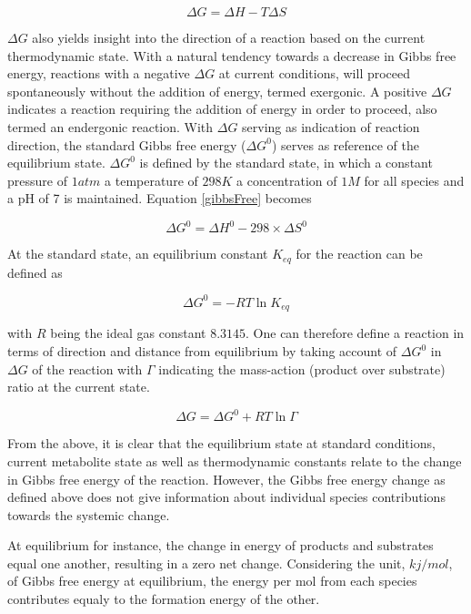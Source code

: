 \begin{equation}\label{gibbsFree}
\Delta G = \Delta H - T \Delta S
\end{equation}

$\Delta G$ also yields insight into the direction of a reaction based on the current thermodynamic state. With a natural tendency towards a decrease in Gibbs free energy, reactions with a negative $\Delta G$ at current conditions, will proceed spontaneously without the addition of energy, termed exergonic. A positive $\Delta G$ indicates a reaction requiring the addition of energy in order to proceed, also termed an endergonic reaction.  With $\Delta G$  serving as indication of reaction direction, the standard Gibbs free energy ($\Delta G^0$) serves as reference of the equilibrium state. $\Delta G^0$ is defined by the standard state, in which a constant pressure of $1 atm$ a temperature of $298K$ a concentration of $1M$ for all species and a pH of 7 is maintained. Equation \ref{gibbsFree} becomes

\begin{equation}
\Delta G^0 = \Delta H^0 - 298 \times \Delta S^0  
\end{equation}

At the standard state, an equilibrium constant $K_{eq}$ for the reaction can be defined as

\begin{equation}
\Delta G^0 = -RT \ln K_{eq}  
\end{equation}

with $R$ being the ideal gas constant $8.3145$. One can therefore define a reaction in terms of direction and distance from equilibrium by taking account of $\Delta G^0$ in $\Delta G$ of the reaction with $\Gamma$ indicating the mass-action (product over substrate) ratio at the current state.

\begin{equation}\label{mass_action}
\Delta G = \Delta G^0 + RT \ln \Gamma
\end{equation}

From the above, it is clear that the equilibrium state at standard conditions, current metabolite state as well as thermodynamic constants relate to the change in Gibbs free energy of the reaction. However, the Gibbs free energy change as defined above does not give information about individual species contributions towards the systemic change.

At equilibrium for instance, the change in energy of products and substrates equal one another, resulting in a zero net change. Considering the unit, $kj/mol$, of Gibbs free energy at equilibrium, the energy per mol from each species contributes equaly to the formation energy of the other.

